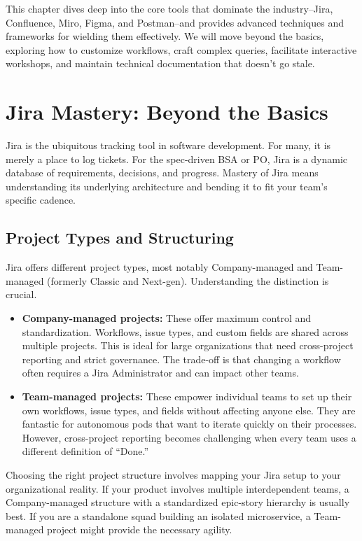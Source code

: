 \documentclass[
  11pt,
  openany,
  oneside]{book}
\providecommand{\tightlist}{%
  \setlength{\itemsep}{0pt}\setlength{\parskip}{0pt}}
\begin{document}
This chapter dives deep into the core tools that dominate the
industry--Jira, Confluence, Miro, Figma, and Postman--and provides
advanced techniques and frameworks for wielding them effectively. We
will move beyond the basics, exploring how to customize workflows, craft
complex queries, facilitate interactive workshops, and maintain
technical documentation that doesn't go stale.

\section{Jira Mastery: Beyond the
Basics}\label{jira-mastery-beyond-the-basics}

Jira is the ubiquitous tracking tool in software development. For many,
it is merely a place to log tickets. For the spec-driven BSA or PO, Jira
is a dynamic database of requirements, decisions, and progress. Mastery
of Jira means understanding its underlying architecture and bending it
to fit your team's specific cadence.

\subsection{Project Types and
Structuring}\label{project-types-and-structuring}

Jira offers different project types, most notably Company-managed and
Team-managed (formerly Classic and Next-gen). Understanding the
distinction is crucial.

\begin{itemize}
\tightlist
\item
  \textbf{Company-managed projects:} These offer maximum control and
  standardization. Workflows, issue types, and custom fields are shared
  across multiple projects. This is ideal for large organizations that
  need cross-project reporting and strict governance. The trade-off is
  that changing a workflow often requires a Jira Administrator and can
  impact other teams.
\item
  \textbf{Team-managed projects:} These empower individual teams to set
  up their own workflows, issue types, and fields without affecting
  anyone else. They are fantastic for autonomous pods that want to
  iterate quickly on their processes. However, cross-project reporting
  becomes challenging when every team uses a different definition of
  ``Done.''
\end{itemize}

Choosing the right project structure involves mapping your Jira setup to
your organizational reality. If your product involves multiple
interdependent teams, a Company-managed structure with a standardized
epic-story hierarchy is usually best. If you are a standalone squad
building an isolated microservice, a Team-managed project might provide
the necessary agility.
\end{document}
